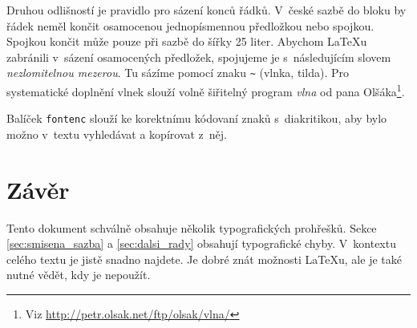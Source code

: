 \documentclass[a4paper, twocolumn, 10pt]{article}
\begin{document}
Druhou odlišností je pravidlo pro sázení konců řádků.
V~české sazbě do bloku by řádek neměl končit osamocenou jednopísmennou předložkou nebo spojkou.
Spojkou  končit může pouze při sazbě do šířky 25 liter.
Abychom \LaTeX u zabránili v~sázení osamocených předložek, spojujeme je s~následujícím slovem \emph{nezlomitelnou mezerou}.
Tu sázíme pomocí znaku \verb|~| (vlnka, tilda).
Pro systematické doplnění vlnek slouží volně šiřitelný program \emph{vlna} od pana Olšáka\footnote{Viz \url{http://petr.olsak.net/ftp/olsak/vlna/}}.

Balíček \texttt{fontenc} slouží ke korektnímu kódovaní znaků s~diakritikou, aby bylo možno v~textu vyhledávat a kopírovat z~něj.

\section{Závěr}
Tento dokument schválně obsahuje několik typografických prohřešků.
Sekce \ref{sec:smisena_sazba} a \ref{sec:dalsi_rady} obsahují typografické chyby.
V~kontextu celého textu je jistě snadno najdete.
Je dobré znát možnosti \LaTeX u, ale je také nutné vědět, kdy je nepoužít.
\end{document}
